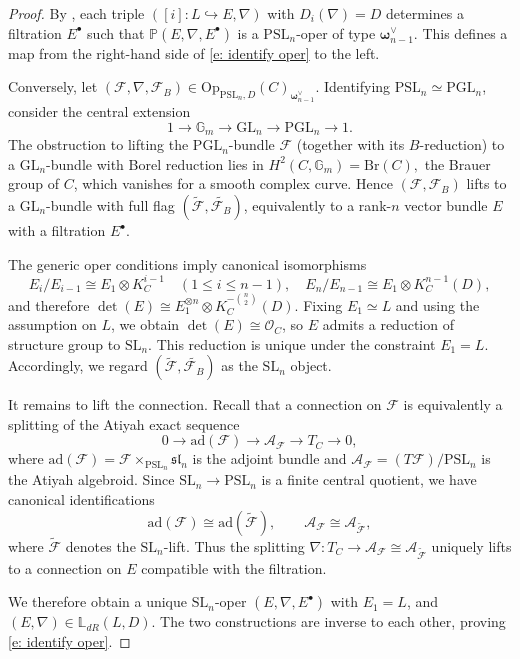 \documentclass[twoside, 11pt]{article}
\numberwithin{equation}{section}
\theoremstyle{theorem}
\numberwithin{theorem}{section}
\theoremstyle{definition}
\begin{document}
\begin{proof}
By , each triple $([i]\colon L\hookrightarrow E,\nabla)$ with
$D_i(\nabla)=D$ determines a filtration $E^\bullet$ such that
$\mathbb P(E,\nabla,E^\bullet)$ is a $\mathrm{PSL}_n$-oper of type $\boldsymbol{\omega}_{n-1}^{\vee}$.
This defines a map from the right-hand side of \eqref{e: identify oper} to the left.

Conversely, let $(\mathcal F,\nabla,\mathcal F_B)\in
\mathrm{Op}_{\mathrm{PSL}_n,D}(C)_{\boldsymbol{\omega}_{n-1}^{\vee}}$.
Identifying $\mathrm{PSL}_n\simeq\mathrm{PGL}_n$, consider the central extension
\[
1\longrightarrow \mathbb G_m \longrightarrow \mathrm{GL}_n \longrightarrow \mathrm{PGL}_n \longrightarrow 1 .
\]
The obstruction to lifting the $\mathrm{PGL}_n$-bundle $\mathcal F$ (together with its $B$-reduction)
to a $\mathrm{GL}_n$-bundle with Borel reduction lies in
\(
H^2(C,\mathbb G_m)=\mathrm{Br}(C),
\)
the Brauer group of $C$, which vanishes for a smooth complex curve. Hence $(\mathcal F,\mathcal F_B)$
lifts to a $\mathrm{GL}_n$-bundle with full flag $(\widetilde{\mathcal F},\widetilde{\mathcal F_B})$, equivalently to a rank-$n$ vector bundle $E$ with a filtration
$E^\bullet$. 

The generic oper conditions imply canonical isomorphisms
\[
E_i/E_{i-1}\cong E_1\otimes K_C^{i-1}\quad (1\le i\le n-1), \quad E_n/E_{n-1}\cong E_1\otimes K_C^{n-1}(D),
\]
and therefore
\(
\det(E)\cong E_1^{\otimes n}\otimes K_C^{-\binom{n}{2}}(D).
\)
Fixing $E_1\simeq L$ and using the assumption on $L$, we obtain $\det(E)\cong\mathcal O_C$, so $E$
admits a reduction of structure group to $\mathrm{SL}_n$. This reduction is unique under the constraint $E_1=L$. Accordingly, we regard $(\widetilde{\mathcal F},\widetilde{\mathcal F_B})$ as the $\mathrm{SL}_n$ object.

It remains to lift the connection.  
Recall that a connection on $\mathcal F$ is equivalently a splitting of the Atiyah exact sequence
\[
0\longrightarrow \mathrm{ad}(\mathcal F)
\longrightarrow \mathcal A_{\mathcal F}
\longrightarrow T_C
\longrightarrow 0,
\]
where $\mathrm{ad}(\mathcal F)=\mathcal F\times_{\mathrm{PSL}_n}\mathfrak{sl}_n$ is the adjoint bundle and
$\mathcal A_{\mathcal F}=(T\mathcal F)/\mathrm{PSL}_n$ is the Atiyah algebroid.
Since $\mathrm{SL}_n\to\mathrm{PSL}_n$ is a finite central quotient, we have canonical identifications
\[
\mathrm{ad}(\mathcal F)\cong \mathrm{ad}(\widetilde{\mathcal F}),\qquad
\mathcal A_{\mathcal F}\cong \mathcal A_{\widetilde{\mathcal F}},
\]
where $\widetilde{\mathcal F}$ denotes the $\mathrm{SL}_n$-lift.
Thus the splitting $\nabla:T_C\to\mathcal A_{\mathcal F}\cong \mathcal A_{\widetilde{\mathcal F}}$ uniquely lifts to a connection on $E$ compatible
with the filtration.

We therefore obtain a unique $\mathrm{SL}_n$-oper $(E,\nabla,E^\bullet)$ with $E_1=L$, and
$(E,\nabla)\in\mathbb L_{dR}(L,D)$. The two constructions are inverse to each other, proving
\eqref{e: identify oper}.
\end{proof}
\end{document}
